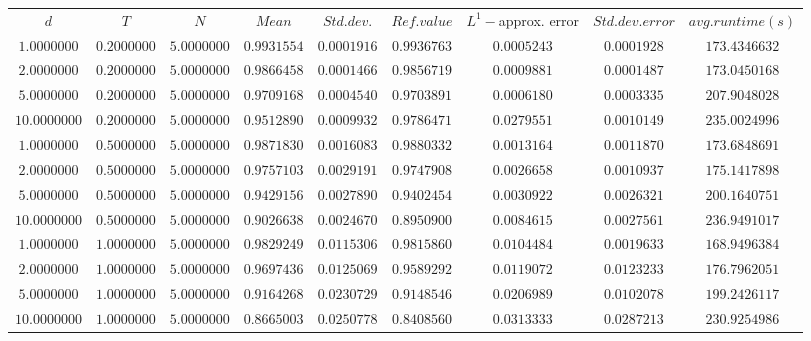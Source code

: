 \begin{tabular}{ccccccccc}
$d$ & $T$ & $N$ & $Mean$ & $Std. dev.$ & $Ref. value$ & $L^1-$approx. error & $Std. dev. error$ & $avg. runtime (s)$\\
$1.0000000$ & $0.2000000$ & $5.0000000$ & $0.9931554$ & $0.0001916$ & $0.9936763$ & $0.0005243$ & $0.0001928$ & $173.4346632$\\
$2.0000000$ & $0.2000000$ & $5.0000000$ & $0.9866458$ & $0.0001466$ & $0.9856719$ & $0.0009881$ & $0.0001487$ & $173.0450168$\\
$5.0000000$ & $0.2000000$ & $5.0000000$ & $0.9709168$ & $0.0004540$ & $0.9703891$ & $0.0006180$ & $0.0003335$ & $207.9048028$\\
$10.0000000$ & $0.2000000$ & $5.0000000$ & $0.9512890$ & $0.0009932$ & $0.9786471$ & $0.0279551$ & $0.0010149$ & $235.0024996$\\
$1.0000000$ & $0.5000000$ & $5.0000000$ & $0.9871830$ & $0.0016083$ & $0.9880332$ & $0.0013164$ & $0.0011870$ & $173.6848691$\\
$2.0000000$ & $0.5000000$ & $5.0000000$ & $0.9757103$ & $0.0029191$ & $0.9747908$ & $0.0026658$ & $0.0010937$ & $175.1417898$\\
$5.0000000$ & $0.5000000$ & $5.0000000$ & $0.9429156$ & $0.0027890$ & $0.9402454$ & $0.0030922$ & $0.0026321$ & $200.1640751$\\
$10.0000000$ & $0.5000000$ & $5.0000000$ & $0.9026638$ & $0.0024670$ & $0.8950900$ & $0.0084615$ & $0.0027561$ & $236.9491017$\\
$1.0000000$ & $1.0000000$ & $5.0000000$ & $0.9829249$ & $0.0115306$ & $0.9815860$ & $0.0104484$ & $0.0019633$ & $168.9496384$\\
$2.0000000$ & $1.0000000$ & $5.0000000$ & $0.9697436$ & $0.0125069$ & $0.9589292$ & $0.0119072$ & $0.0123233$ & $176.7962051$\\
$5.0000000$ & $1.0000000$ & $5.0000000$ & $0.9164268$ & $0.0230729$ & $0.9148546$ & $0.0206989$ & $0.0102078$ & $199.2426117$\\
$10.0000000$ & $1.0000000$ & $5.0000000$ & $0.8665003$ & $0.0250778$ & $0.8408560$ & $0.0313333$ & $0.0287213$ & $230.9254986$\\
\end{tabular}
